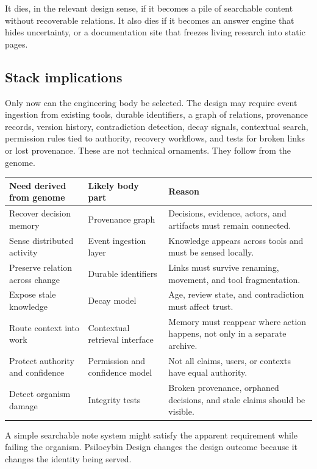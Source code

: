 \documentclass[11pt]{article}
\begin{document}
It dies, in the relevant design sense, if it becomes a pile of searchable content without recoverable relations. It also dies if it becomes an answer engine that hides uncertainty, or a documentation site that freezes living research into static pages.

\subsection{Stack implications}

Only now can the engineering body be selected. The design may require event ingestion from existing tools, durable identifiers, a graph of relations, provenance records, version history, contradiction detection, decay signals, contextual search, permission rules tied to authority, recovery workflows, and tests for broken links or lost provenance. These are not technical ornaments. They follow from the genome.

\begin{longtable}{|p{}|p{}|p{}|}
\hline
\textbf{Need derived from genome} & \textbf{Likely body part} & \textbf{Reason} \\
\hline
Recover decision memory & Provenance graph & Decisions, evidence, actors, and artifacts must remain connected. \\
\hline
Sense distributed activity & Event ingestion layer & Knowledge appears across tools and must be sensed locally. \\
\hline
Preserve relation across change & Durable identifiers & Links must survive renaming, movement, and tool fragmentation. \\
\hline
Expose stale knowledge & Decay model & Age, review state, and contradiction must affect trust. \\
\hline
Route context into work & Contextual retrieval interface & Memory must reappear where action happens, not only in a separate archive. \\
\hline
Protect authority and confidence & Permission and confidence model & Not all claims, users, or contexts have equal authority. \\
\hline
Detect organism damage & Integrity tests & Broken provenance, orphaned decisions, and stale claims should be visible. \\
\hline
\end{longtable}

A simple searchable note system might satisfy the apparent requirement while failing the organism. Psilocybin Design changes the design outcome because it changes the identity being served.
\end{document}
